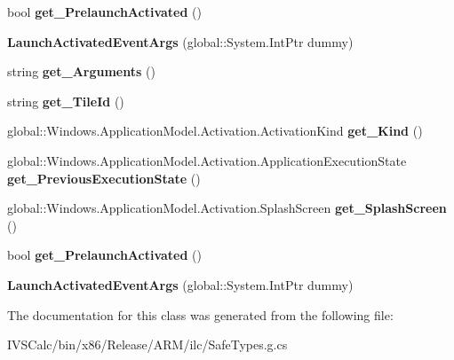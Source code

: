 \begin{DoxyCompactItemize}
bool {\bfseries get\+\_\+\+Prelaunch\+Activated} ()
\item 
\mbox{\label{class_windows_1_1_application_model_1_1_activation_1_1_launch_activated_event_args_a16f7ab7f04a1992d706c870058f3cc71}} 
{\bfseries Launch\+Activated\+Event\+Args} (global\+::\+System.\+Int\+Ptr dummy)
\item 
\mbox{\label{class_windows_1_1_application_model_1_1_activation_1_1_launch_activated_event_args_a2f0e833400f9a526d769829a2929be6e}} 
string {\bfseries get\+\_\+\+Arguments} ()
\item 
\mbox{\label{class_windows_1_1_application_model_1_1_activation_1_1_launch_activated_event_args_abfe42f834df00c44cb26f19ea3df1f47}} 
string {\bfseries get\+\_\+\+Tile\+Id} ()
\item 
\mbox{\label{class_windows_1_1_application_model_1_1_activation_1_1_launch_activated_event_args_a8a1941039506449bd08dae63fe6deaaa}} 
global\+::\+Windows.\+Application\+Model.\+Activation.\+Activation\+Kind {\bfseries get\+\_\+\+Kind} ()
\item 
\mbox{\label{class_windows_1_1_application_model_1_1_activation_1_1_launch_activated_event_args_acf63cfda1c3de4f08983a4af7c24697b}} 
global\+::\+Windows.\+Application\+Model.\+Activation.\+Application\+Execution\+State {\bfseries get\+\_\+\+Previous\+Execution\+State} ()
\item 
\mbox{\label{class_windows_1_1_application_model_1_1_activation_1_1_launch_activated_event_args_a971bc89f3d06dc11ddb57e25333dcb8a}} 
global\+::\+Windows.\+Application\+Model.\+Activation.\+Splash\+Screen {\bfseries get\+\_\+\+Splash\+Screen} ()
\item 
\mbox{\label{class_windows_1_1_application_model_1_1_activation_1_1_launch_activated_event_args_a0e1e0d199b725ce3e4aeb5f0c33874c2}} 
bool {\bfseries get\+\_\+\+Prelaunch\+Activated} ()
\item 
\mbox{\label{class_windows_1_1_application_model_1_1_activation_1_1_launch_activated_event_args_a16f7ab7f04a1992d706c870058f3cc71}} 
{\bfseries Launch\+Activated\+Event\+Args} (global\+::\+System.\+Int\+Ptr dummy)
\end{DoxyCompactItemize}


The documentation for this class was generated from the following file\+:\begin{DoxyCompactItemize}
\item 
I\+V\+S\+Calc/bin/x86/\+Release/\+A\+R\+M/ilc/Safe\+Types.\+g.\+cs\end{DoxyCompactItemize}
